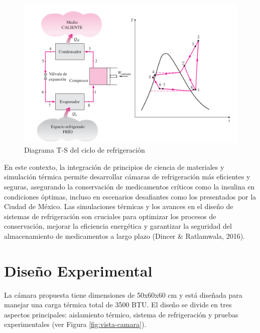\documentclass[11pt,a4paper]{article}
\begin{document}
\begin{multicols}{2}
\begin{figure}[H]
	\centering
	\includegraphics[width=\linewidth]{figures/diag-ts}
	\caption{Diagrama T-S del ciclo de refrigeración}
	\label{fig:diag-ts}
	\end{figure} En este contexto, la integración de principios de ciencia de materiales y simulación térmica permite desarrollar cámaras de refrigeración más eficientes y seguras, asegurando la conservación de medicamentos críticos como la insulina en condiciones óptimas, incluso en escenarios desafiantes como los presentados por la Ciudad de México. Las simulaciones térmicas y los avances en el diseño de sistemas de refrigeración son cruciales para optimizar los procesos de conservación, mejorar la eficiencia energética y garantizar la seguridad del almacenamiento de medicamentos a largo plazo (Dincer \& Ratlamwala, 2016).

	\section{Diseño Experimental}
	La cámara propuesta tiene dimensiones de 50x60x60 cm y está diseñada para manejar una carga térmica total de 3500 BTU. El diseño se divide en tres aspectos principales: aislamiento térmico, sistema de refrigeración y pruebas experimentales (ver Figura \ref{fig:vista-camara}).



\end{multicols}
\end{document}
